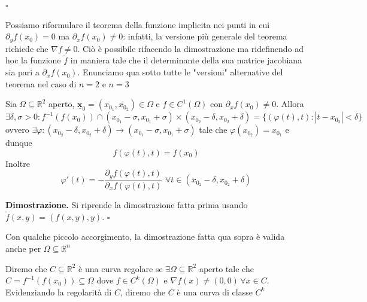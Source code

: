 \hfill $\square$

\begin{remark}
Possiamo riformulare il teorema della funzione implicita nei punti in cui $\partial_y f(x_0) = 0$ ma $\partial_x f(x_0) \neq 0$: infatti, la versione più generale del teorema richiede che $\nabla f \neq 0$. Ciò è possibile rifacendo la dimostrazione ma ridefinendo ad hoc la funzione $\tilde{f}$ in maniera tale che il determinante della sua matrice jacobiana sia pari a $\partial_x f(x_0)$. Enunciamo qua sotto tutte le "versioni" alternative del teorema nel caso di $n=2$ e $n=3$
\end{remark}

\vspace{0.5cm}
\begin{theorem}[\textcolor{blue}{Della funzione implicita rispetto a $y$}]
Sia $\Omega \subseteq \mathbb{R}^2$ aperto, $\bm{\underline{x}}_0 = (x_{0_1}, x_{0_2}) \in \Omega$ e $f \in C^{1}(\Omega)$ con $\partial_{x} f(x_0) \neq 0$. Allora
$$
\exists \delta, \sigma > 0 : f^{-1}(f(x_0)) \cap (x_{0_1} - \sigma, x_{0_1} + \sigma) \times (x_{0_2} - \delta, x_{0_2} + \delta) = \{ (\varphi(t), t) : |t-x_{0_2}| < \delta \}
$$
ovvero $\exists \varphi : (x_{0_2} - \delta, x_{0_2} + \delta) \to (x_{0_1} - \sigma, x_{0_1} + \sigma)$ tale che $\varphi(x_{0_2}) = x_{0_1}$ e dunque
$$
f(\varphi(t), t) = f(x_0)
$$
Inoltre
$$
\varphi'(t) = -\frac{\partial_y f(\varphi(t), t)}{\partial_x f(\varphi(t), t)} \, \, \forall t \in (x_{0_2} - \delta, x_{0_2} + \delta)
$$
\end{theorem}

\noindent \textbf{Dimostrazione. }
Si riprende la dimostrazione fatta prima usando $\tilde{f}(x, y) = (f(x, y), y)$. 
\hfill $\square$

Con qualche piccolo accorgimento, la dimostrazione fatta qua sopra è valida anche per $\Omega \subseteq \mathbb{R}^{n}$ 

\vspace{0.5cm}
\begin{definition}[\textcolor{blue}{Curva regolare}]
Diremo che $C \subseteq \mathbb{R}^2$ è una curva regolare se $\exists \Omega \subseteq \mathbb{R}^2$ aperto tale che $C = f^{-1}(f(x_0)) \subseteq \Omega$ dove $f \in C^k (\Omega)$ e $\nabla f(x) \neq (0, 0) \, \forall x \in C$. \\
Evidenziando la regolarità di $C$, diremo che $C$ è una curva di classe $C^k$
\end{definition}

